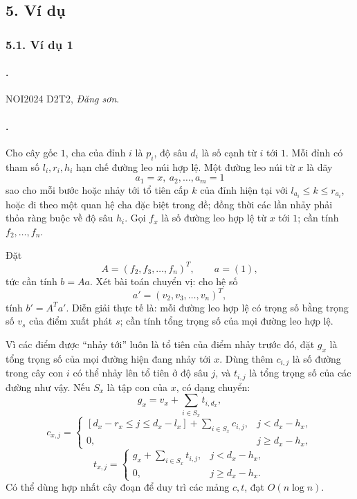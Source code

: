 \documentclass[11pt]{article}
\begin{document}
\subsection*{5. Ví dụ}

\subsubsection*{5.1. Ví dụ 1}

\paragraph{.}
NOI2024 D2T2, \emph{Đăng sơn}.

\paragraph{.}
Cho cây gốc \(1\), cha của đỉnh \(i\) là \(p_i\), độ sâu \(d_i\) là số cạnh từ
\(i\) tới \(1\). Mỗi đỉnh có tham số \(l_i,r_i,h_i\) hạn chế đường leo núi hợp
lệ. Một đường leo núi từ \(x\) là dãy
\[
  a_1=x,\ a_2,\ldots,a_m=1
\]
sao cho mỗi bước hoặc nhảy tới tổ tiên cấp \(k\) của đỉnh hiện tại với
\(l_{a_i}\le k\le r_{a_i}\), hoặc đi theo một quan hệ cha đặc biệt trong đề; đồng
thời các lần nhảy phải thỏa ràng buộc về độ sâu \(h_i\). Gọi \(f_x\) là số
đường leo hợp lệ từ \(x\) tới \(1\); cần tính \(f_2,\ldots,f_n\).

Đặt
\[
  A=(f_2,f_3,\ldots,f_n)^T,\qquad a=(1),
\]
tức cần tính \(b=Aa\). Xét bài toán chuyển vị: cho hệ số
\[
  a'=(v_2,v_3,\ldots,v_n)^T,
\]
tính \(b'=A^T a'\). Diễn giải thực tế là: mỗi đường leo hợp lệ có trọng số bằng
trọng số \(v_s\) của điểm xuất phát \(s\); cần tính tổng trọng số của mọi đường
leo hợp lệ.

Vì các điểm được ``nhảy tới'' luôn là tổ tiên của điểm nhảy trước đó, đặt
\(g_x\) là tổng trọng số của mọi đường hiện đang nhảy tới \(x\). Dùng thêm
\(c_{i,j}\) là số đường trong cây con \(i\) có thể nhảy lên tổ tiên ở độ sâu
\(j\), và \(t_{i,j}\) là tổng trọng số của các đường như vậy. Nếu \(S_x\) là
tập con của \(x\), có dạng chuyển:
\[
  g_x=v_x+\sum_{i\in S_x}t_{i,d_x},
\]
\[
  c_{x,j}=
  \begin{cases}
    [d_x-r_x\le j\le d_x-l_x]+\sum_{i\in S_x}c_{i,j},
      & j<d_x-h_x,\\
    0, & j\ge d_x-h_x,
  \end{cases}
\]
\[
  t_{x,j}=
  \begin{cases}
    g_x+\sum_{i\in S_x}t_{i,j}, & j<d_x-h_x,\\
    0, & j\ge d_x-h_x.
  \end{cases}
\]
Có thể dùng hợp nhất cây đoạn để duy trì các mảng \(c,t\), đạt
\(O(n\log n)\).
\end{document}
